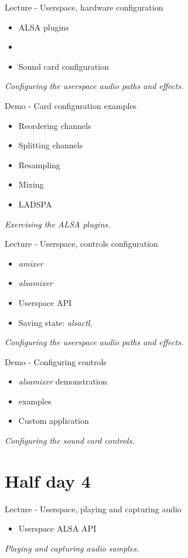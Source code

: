 \documentclass[a4paper,12pt,obeyspaces,spaces,hyphens]{article}
\begin{document}
\feagendatwocolumn
{Lecture - Userspace, hardware configuration}
{
  \begin{itemize}
  \item ALSA plugins
  \item {}
  \item Sound card configuration
  \end{itemize}
  \vspace{0.5em}
  {\em Configuring the userspace audio paths and effects.}
}
{Demo - Card configuration examples}
{
  \begin{itemize}
  \item Reordering channels
  \item Splitting channels
  \item Resampling
  \item Mixing
  \item LADSPA
  \end{itemize}
  \vspace{0.5em}
  {\em Exercising the ALSA plugins.}
}

\feagendatwocolumn
{Lecture - Userspace, controls configuration}
{
  \begin{itemize}
  \item {\em amixer}
  \item {\em alsamixer}
  \item Userspace API
  \item Saving state: {\em alsactl}, 
  \end{itemize}
  \vspace{0.5em}
  {\em Configuring the userspace audio paths and effects.}
}
{Demo - Configuring controls}
{
  \begin{itemize}
  \item {\em alsamixer} demonstration
  \item {} examples
  \item Custom application
  \end{itemize}
  \vspace{0.5em}
  {\em Configuring the sound card controls.}
}

\section{Half day 4}

\feagendaonecolumn
{Lecture - Userspace, playing and capturing audio}
{
  \begin{itemize}
  \item Userspace ALSA API
  \end{itemize}
  \vspace{0.5em}
  {\em Playing and capturing audio samples.}
}
\end{document}
